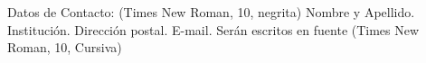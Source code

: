 Datos de Contacto: (Times New Roman, 10, negrita) 
Nombre y Apellido. Institución. Dirección postal. E-mail. Serán escritos en fuente (Times New Roman, 10, Cursiva)
